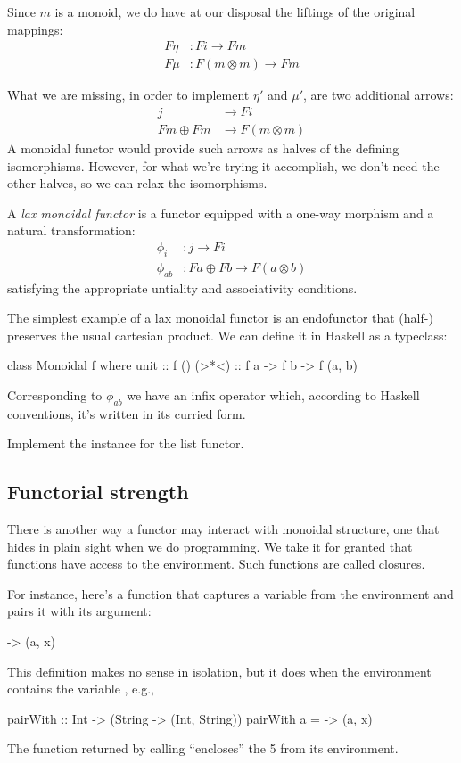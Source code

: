 \documentclass[DaoFP]{subfiles}
\begin{document}
Since $m$ is a monoid, we do have at our disposal the liftings of the original mappings:
\begin{align*}
 F \eta &\colon F i \to F m \\
 F \mu &\colon F (m \otimes m) \to F m
\end{align*}

What we are missing, in order to implement $\eta'$ and $\mu'$, are two additional arrows:
\begin{align*}
j &\to F i\\
 F m \oplus F m &\to F (m \otimes m)
 \end{align*}
A monoidal functor would provide such arrows as halves of the defining isomorphisms. However, for what we're trying it accomplish, we don't need the other halves, so we can relax the isomorphisms. 

A \emph{lax monoidal functor} is a functor equipped with a one-way morphism and a natural transformation:
\begin{align*}
\phi_i &\colon j \to F i \\
\phi_{a b} &\colon F a \oplus F b \to F (a \otimes b)
\end{align*}
satisfying the appropriate untiality and associativity conditions.

The simplest example of a lax monoidal functor is an endofunctor that (half-) preserves the usual cartesian product. We can define it in Haskell as a typeclass:

\begin{haskell}
class Monoidal f where
  unit  :: f ()
  (>*<) :: f a -> f b -> f (a, b)
\end{haskell}
Corresponding to $\phi_{a b}$ we have an infix operator which, according to Haskell conventions, it's written in its curried form.

\begin{exercise}
Implement the  instance for the list functor.
\end{exercise}

\subsection{Functorial strength}

There is another way a functor may interact with monoidal structure, one that hides in plain sight when we do programming. We take it for granted that functions have access to the environment. Such functions are called closures. 

For instance, here's a function that captures a variable  from the environment and pairs it with its argument:
\begin{haskell}
\x -> (a, x)
\end{haskell}
This definition makes no sense in isolation, but it does when the environment contains the variable , e.g.,
\begin{haskell}
pairWith :: Int -> (String -> (Int, String))
pairWith a = \x -> (a, x)
\end{haskell}
The function returned by calling  ``encloses'' the 5 from its environment.
\end{document}
